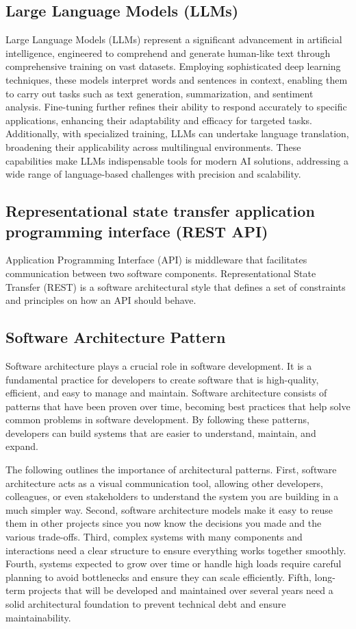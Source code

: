     \subsection{Large Language Models (LLMs)}
    Large Language Models (LLMs) represent a significant advancement in artificial intelligence, engineered to comprehend and generate human-like text through comprehensive training on vast datasets. Employing sophisticated deep learning techniques, these models interpret words and sentences in context, enabling them to carry out tasks such as text generation, summarization, and sentiment analysis. Fine-tuning further refines their ability to respond accurately to specific applications, enhancing their adaptability and efficacy for targeted tasks. Additionally, with specialized training, LLMs can undertake language translation, broadening their applicability across multilingual environments. These capabilities make LLMs indispensable tools for modern AI solutions, addressing a wide range of language-based challenges with precision and scalability.
    \subsection{Representational state transfer application programming interface (REST API)}
    Application Programming Interface (API) is middleware that facilitates communication between two software components. Representational State Transfer (REST) is a software architectural style that defines a set of constraints and principles on how an API should behave.
    \subsection{Software Architecture Pattern}
    Software architecture plays a crucial role in software development. It is a fundamental practice for developers to create software that is high-quality, efficient, and easy to manage and maintain. Software architecture consists of patterns that have been proven over time, becoming best practices that help solve common problems in software development. By following these patterns, developers can build systems that are easier to understand, maintain, and expand. 
    \cite{Arslan} 

    The following outlines the importance of architectural patterns. First, software architecture acts as a visual communication tool, allowing other developers, colleagues, or even stakeholders to understand the system you are building in a much simpler way. Second, software architecture models make it easy to reuse them in other projects since you now know the decisions you made and the various trade-offs. Third, complex systems with many components and interactions need a clear structure to ensure everything works together smoothly. Fourth, systems expected to grow over time or handle high loads require careful planning to avoid bottlenecks and ensure they can scale efficiently. Fifth, long-term projects that will be developed and maintained over several years need a solid architectural foundation to prevent technical debt and ensure maintainability.
    \cite{Abbas} 
    
